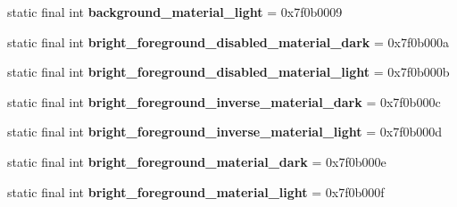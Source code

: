 \begin{DoxyCompactItemize}
\item 
\hypertarget{classandroid_1_1support_1_1v7_1_1appcompat_1_1_r_1_1color_a1c8d477e6576af0acfc5b783c2b74c8f}{}static final int {\bfseries background\+\_\+material\+\_\+light} = 0x7f0b0009\label{classandroid_1_1support_1_1v7_1_1appcompat_1_1_r_1_1color_a1c8d477e6576af0acfc5b783c2b74c8f}

\item 
\hypertarget{classandroid_1_1support_1_1v7_1_1appcompat_1_1_r_1_1color_acd8ae12711e58675f842f9c0c0bb806e}{}static final int {\bfseries bright\+\_\+foreground\+\_\+disabled\+\_\+material\+\_\+dark} = 0x7f0b000a\label{classandroid_1_1support_1_1v7_1_1appcompat_1_1_r_1_1color_acd8ae12711e58675f842f9c0c0bb806e}

\item 
\hypertarget{classandroid_1_1support_1_1v7_1_1appcompat_1_1_r_1_1color_a33c7c2b4401cb8356a155a1afe362b47}{}static final int {\bfseries bright\+\_\+foreground\+\_\+disabled\+\_\+material\+\_\+light} = 0x7f0b000b\label{classandroid_1_1support_1_1v7_1_1appcompat_1_1_r_1_1color_a33c7c2b4401cb8356a155a1afe362b47}

\item 
\hypertarget{classandroid_1_1support_1_1v7_1_1appcompat_1_1_r_1_1color_a1aa7ffb5447caf2b78c940133396d6d7}{}static final int {\bfseries bright\+\_\+foreground\+\_\+inverse\+\_\+material\+\_\+dark} = 0x7f0b000c\label{classandroid_1_1support_1_1v7_1_1appcompat_1_1_r_1_1color_a1aa7ffb5447caf2b78c940133396d6d7}

\item 
\hypertarget{classandroid_1_1support_1_1v7_1_1appcompat_1_1_r_1_1color_ab4869d9734586f545a779eda36be9aea}{}static final int {\bfseries bright\+\_\+foreground\+\_\+inverse\+\_\+material\+\_\+light} = 0x7f0b000d\label{classandroid_1_1support_1_1v7_1_1appcompat_1_1_r_1_1color_ab4869d9734586f545a779eda36be9aea}

\item 
\hypertarget{classandroid_1_1support_1_1v7_1_1appcompat_1_1_r_1_1color_a4597a12719cad1f96c80e5f687750001}{}static final int {\bfseries bright\+\_\+foreground\+\_\+material\+\_\+dark} = 0x7f0b000e\label{classandroid_1_1support_1_1v7_1_1appcompat_1_1_r_1_1color_a4597a12719cad1f96c80e5f687750001}

\item 
\hypertarget{classandroid_1_1support_1_1v7_1_1appcompat_1_1_r_1_1color_ad034dc588b96d089b75eaa50a7c58b7b}{}static final int {\bfseries bright\+\_\+foreground\+\_\+material\+\_\+light} = 0x7f0b000f\label{classandroid_1_1support_1_1v7_1_1appcompat_1_1_r_1_1color_ad034dc588b96d089b75eaa50a7c58b7b}


\end{DoxyCompactItemize}
